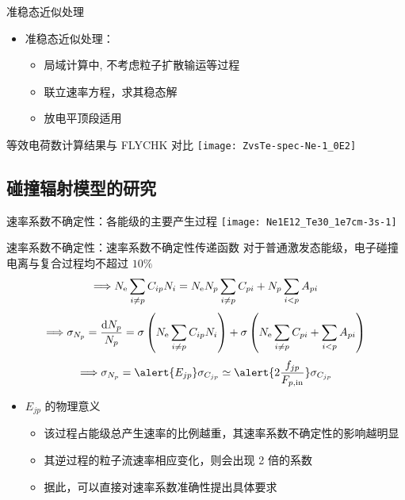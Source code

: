 \begin{CJK*}{UTF8}{kai}
\begin{frame}{准稳态近似处理}
	\begin{itemize}%
		\item 准稳态近似处理：%
			\begin{itemize}
				\item 局域计算中, 不考虑粒子扩散输运等过程
				\item 联立速率方程，求其稳态解
				\item 放电平顶段适用
			\end{itemize}
	\end{itemize}

\end{frame}

\begin{frame}{等效电荷数计算结果与 FLYCHK 对比}
	\centering
	\texttt{[image: ZvsTe-spec-Ne-1\_0E2]}
\end{frame}

\subsection{碰撞辐射模型的研究}

\begin{frame}{速率系数不确定性：各能级的主要产生过程}
	\centering
	\texttt{[image: Ne1E12\_Te30\_1e7cm-3s-1]}
\end{frame}

\begin{frame}{速率系数不确定性：速率系数不确定性传递函数}
	\centering
	对于普通激发态能级，电子碰撞电离与复合过程均不超过 $10\%$
	$$\Longrightarrow N_{\rm e}\sum_{i\ne p}C_{ip}N_i=N_{\rm e}N_p\sum_{i\ne p}C_{pi}+N_p\sum_{i<p}A_{pi}$$
	$$\Longrightarrow \sigma_{N_p}=\frac{{\rm d}N_p}{N_p} = \sigma\left(N_{\rm e}\sum_{i\ne p}C_{ip}N_i\right) + \sigma\left(N_{\rm e}\sum_{i\ne p}C_{pi}+\sum_{i<p}A_{pi}\right)$$
	$$\Longrightarrow \sigma_{N_p}=\alert{E_{jp}}\sigma_{C_{jp}}\simeq\alert{2\frac{f_{jp}}{F_{p,{\rm in}}}}\sigma_{C_{jp}}$$
	\begin{itemize}
		\item $E_{jp}$ 的物理意义
			\begin{itemize}
				\item 该过程占能级总产生速率的比例越重，其速率系数不确定性的影响越明显
				\item 其逆过程的粒子流速率相应变化，则会出现 2 倍的系数
				\item 据此，可以\alert{直接}对速率系数准确性提出具体要求
			\end{itemize}
	\end{itemize}
\end{frame}


\end{CJK*}
